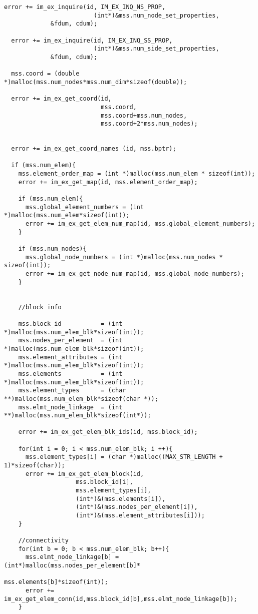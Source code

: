 \begin{Verbatim}[fontsize=\small]
  error += im_ex_inquire(id, IM_EX_INQ_NS_PROP, 
                         (int*)&mss.num_node_set_properties, 
			 &fdum, cdum);
    
  error += im_ex_inquire(id, IM_EX_INQ_SS_PROP, 
                         (int*)&mss.num_side_set_properties, 
			 &fdum, cdum);
    
  mss.coord = (double *)malloc(mss.num_nodes*mss.num_dim*sizeof(double));
    
  error += im_ex_get_coord(id,
                           mss.coord,
                           mss.coord+mss.num_nodes,
                           mss.coord+2*mss.num_nodes);

    
  error += im_ex_get_coord_names (id, mss.bptr);
    
  if (mss.num_elem){
    mss.element_order_map = (int *)malloc(mss.num_elem * sizeof(int));
    error += im_ex_get_map(id, mss.element_order_map);
      
    if (mss.num_elem){
      mss.global_element_numbers = (int *)malloc(mss.num_elem*sizeof(int));
      error += im_ex_get_elem_num_map(id, mss.global_element_numbers);
    }
      
    if (mss.num_nodes){
      mss.global_node_numbers = (int *)malloc(mss.num_nodes * sizeof(int));
      error += im_ex_get_node_num_map(id, mss.global_node_numbers);
    }
      
     
    //block info

    mss.block_id           = (int *)malloc(mss.num_elem_blk*sizeof(int));
    mss.nodes_per_element  = (int *)malloc(mss.num_elem_blk*sizeof(int));
    mss.element_attributes = (int *)malloc(mss.num_elem_blk*sizeof(int));
    mss.elements           = (int *)malloc(mss.num_elem_blk*sizeof(int));
    mss.element_types      = (char **)malloc(mss.num_elem_blk*sizeof(char *));
    mss.elmt_node_linkage  = (int **)malloc(mss.num_elem_blk*sizeof(int*));

    error += im_ex_get_elem_blk_ids(id, mss.block_id);

    for(int i = 0; i < mss.num_elem_blk; i ++){
      mss.element_types[i] = (char *)malloc((MAX_STR_LENGTH + 1)*sizeof(char));
      error += im_ex_get_elem_block(id, 
				    mss.block_id[i], 
				    mss.element_types[i],
				    (int*)&(mss.elements[i]),
				    (int*)&(mss.nodes_per_element[i]), 
				    (int*)&(mss.element_attributes[i]));
    }
    
    //connectivity
    for(int b = 0; b < mss.num_elem_blk; b++){
      mss.elmt_node_linkage[b] = (int*)malloc(mss.nodes_per_element[b]*
                                              mss.elements[b]*sizeof(int));
      error += im_ex_get_elem_conn(id,mss.block_id[b],mss.elmt_node_linkage[b]);
    }


\end{Verbatim}
